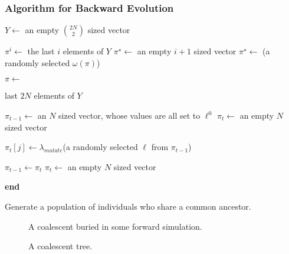 \subsubsection{Algorithm for Backward Evolution}
\begin{algorithm}[ht]
    \SetAlgoLined
    \DontPrintSemicolon
     {
        $Y \gets $ an empty $\binom{2N}{2}$ sized vector \;

         {
            $\pi^i \gets $ the last $i$ elements of $Y$ \;
            $\pi^\star \gets $ an empty $i + 1$ sized vector \;
             {
                $\pi^\star \gets $ (a randomly selected $\omega(\pi)$) \;
            }
        }

        $\pi \gets $

        \Return last $2N$ elements of $Y$ \;

        $\pi_{t-1} \gets $ an $N$ sized vector, whose values are all set to $\ell^0$ \;
        $\pi_t \gets $ an empty $N$ sized vector \;
         {
             {
                $\pi_t[j] \gets \lambda_{mutate}$(a randomly selected $\ell$ from $\pi_{t-1}$) \;

            }
            $\pi_{t-1} \gets \pi_t$ \;
            $\pi_t \gets$ an empty $N$ sized vector \;
        }
    }
    \textbf{end} \;
    \caption{Generate a population of individuals who share a common ancestor.}
    \label{alg:twoStageBackwardEvolution}
\end{algorithm}


\begin{figure}
    \centering
    \subfloat{{  }}
    \qquad \qquad \qquad
    \subfloat{{  }}
    \caption{A coalescent buried in some forward simulation.}
    \label{fig:coalescentBuried}
\end{figure}

\begin{figure}
    \centering
    
    \caption{A coalescent tree.}
    \label{fig:coalescentTree}
\end{figure}